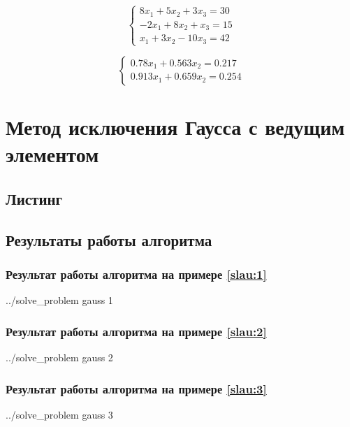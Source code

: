 \documentclass[a4paper]{article}
\begin{document}
\begin{equation}
    \begin{cases}
         8 x_1 + 5 x_2  + 3  x_3 = 30 \\
        -2 x_1 + 8 x_2  +    x_3 = 15 \\
           x_1 + 3 x_2  - 10 x_3 = 42
    \end{cases} \label{slau:4}
\end{equation}

\begin{equation}
    \begin{cases}
        0.78  x_1 + 0.563 x_2 = 0.217 \\
        0.913 x_1 + 0.659 x_2 = 0.254
    \end{cases} \label{slau:5}
\end{equation}

\section{Метод исключения Гаусса с ведущим элементом}

\subsection{Листинг}


\subsection{Результаты работы алгоритма}

\subsubsection{Результат работы алгоритма на примере \eqref{slau:1}}
\bash[stdout]
../solve_problem gauss 1
\END

\subsubsection{Результат работы алгоритма на примере \eqref{slau:2}}
\bash[stdout]
../solve_problem gauss 2
\END

\subsubsection{Результат работы алгоритма на примере \eqref{slau:3}}
\bash[stdout]
../solve_problem gauss 3
\END
\end{document}
